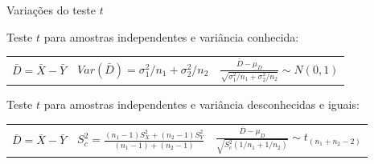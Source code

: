\documentclass{beamer}\usepackage[]{graphicx}\usepackage[]{color}
\begin{document}
\begin{frame}{Variações do teste $t$}

Teste $t$ para amostras independentes e variância conhecida: 
\vfill

\begin{scriptsize}
\begin{tabular}{ c c c }

$\bar{D} = \bar{X} - \bar{Y}$ & $Var(\bar{D}) = \sigma^{2}_{1}/n_1 + \sigma^{2}_{2}/n_2$ & $\frac{\bar{D}-\mu_D}{\sqrt{\sigma^{2}_{1}/n_1 + \sigma^{2}_{2}/n_2}} \sim N(0,1)$   \\

\end{tabular}
\end{scriptsize}

\vfill

Teste $t$ para amostras independentes e variância desconhecidas e iguais: 
\vfill

\begin{scriptsize}
\begin{tabular}{ c c c }

$\bar{D} = \bar{X} - \bar{Y}$ & $ S^{2}_{c} = \frac{(n_1-1)S^{2}_{X}+(n_2-1)S^{2}_{Y}}{(n_1-1)+(n_2-1)}$ & $\frac{\bar{D}-\mu_D}{\sqrt{S^{2}_{c}(1/n_1 + 1/n_2)}} \sim t_{(n_1+n_2-2)}$   \\

\end{tabular}
\end{scriptsize}

\end{frame}
\end{document}
